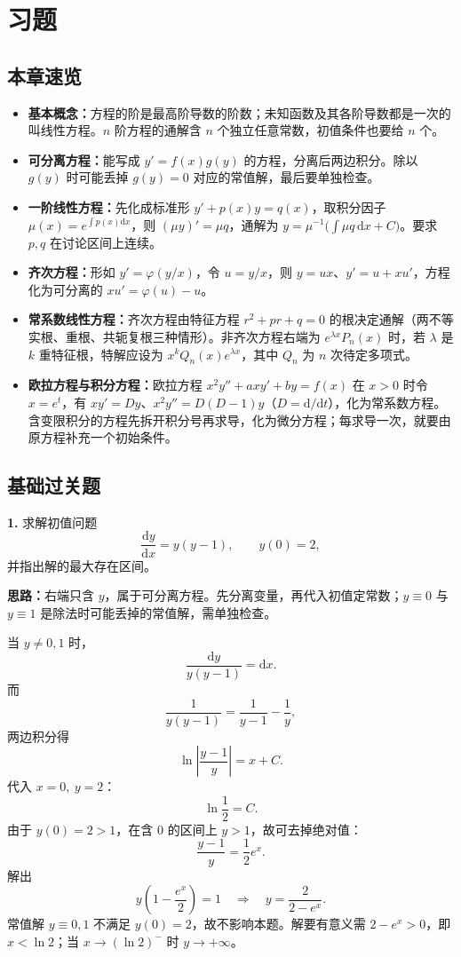 \section{习题}

\subsection{本章速览}

\begin{itemize}
  \item \textbf{基本概念：}方程的阶是最高阶导数的阶数；未知函数及其各阶导数都是一次的叫线性方程。$n$ 阶方程的通解含 $n$ 个独立任意常数，初值条件也要给 $n$ 个。
  \item \textbf{可分离方程：}能写成 $y'=f(x)g(y)$ 的方程，分离后两边积分。除以 $g(y)$ 时可能丢掉 $g(y)=0$ 对应的常值解，最后要单独检查。
  \item \textbf{一阶线性方程：}先化成标准形 $y'+p(x)y=q(x)$，取积分因子 $\mu(x)=e^{\int p(x)\mathrm{d}x}$，则 $(\mu y)'=\mu q$，通解为 $y=\mu^{-1}\bigl(\int \mu q\,\mathrm{d}x+C\bigr)$。要求 $p,q$ 在讨论区间上连续。
  \item \textbf{齐次方程：}形如 $y'=\varphi(y/x)$，令 $u=y/x$，则 $y=ux$、$y'=u+xu'$，方程化为可分离的 $xu'=\varphi(u)-u$。
  \item \textbf{常系数线性方程：}齐次方程由特征方程 $r^2+pr+q=0$ 的根决定通解（两不等实根、重根、共轭复根三种情形）。非齐次方程右端为 $e^{\lambda x}P_n(x)$ 时，若 $\lambda$ 是 $k$ 重特征根，特解应设为 $x^kQ_n(x)e^{\lambda x}$，其中 $Q_n$ 为 $n$ 次待定多项式。
  \item \textbf{欧拉方程与积分方程：}欧拉方程 $x^2y''+axy'+by=f(x)$ 在 $x>0$ 时令 $x=e^t$，有 $xy'=Dy$、$x^2y''=D(D-1)y$（$D=\mathrm{d}/\mathrm{d}t$），化为常系数方程。含变限积分的方程先拆开积分号再求导，化为微分方程；每求导一次，就要由原方程补充一个初始条件。
\end{itemize}

\subsection{基础过关题}

\textbf{1.} 求解初值问题
\[
\frac{\mathrm{d}y}{\mathrm{d}x}=y(y-1),\qquad y(0)=2,
\]
并指出解的最大存在区间。

\ifshowsolutions%
\textbf{思路：}右端只含 $y$，属于可分离方程。先分离变量，再代入初值定常数；$y\equiv 0$ 与 $y\equiv 1$ 是除法时可能丢掉的常值解，需单独检查。

当 $y\neq 0,1$ 时，
\[
\frac{\mathrm{d}y}{y(y-1)}=\mathrm{d}x.
\]
而
\[
\frac{1}{y(y-1)}=\frac{1}{y-1}-\frac{1}{y},
\]
两边积分得
\[
\ln\left|\frac{y-1}{y}\right|=x+C.
\]
代入 $x=0,\ y=2$：
\[
\ln\frac12=C.
\]
由于 $y(0)=2>1$，在含 $0$ 的区间上 $y>1$，故可去掉绝对值：
\[
\frac{y-1}{y}=\frac{1}{2}e^{x}.
\]
解出
\[
y\left(1-\frac{e^x}{2}\right)=1
\quad\Longrightarrow\quad
y=\frac{2}{2-e^x}.
\]
常值解 $y\equiv 0,1$ 不满足 $y(0)=2$，故不影响本题。解要有意义需 $2-e^x>0$，即 $x<\ln 2$；当 $x\to(\ln 2)^-$ 时 $y\to+\infty$。

